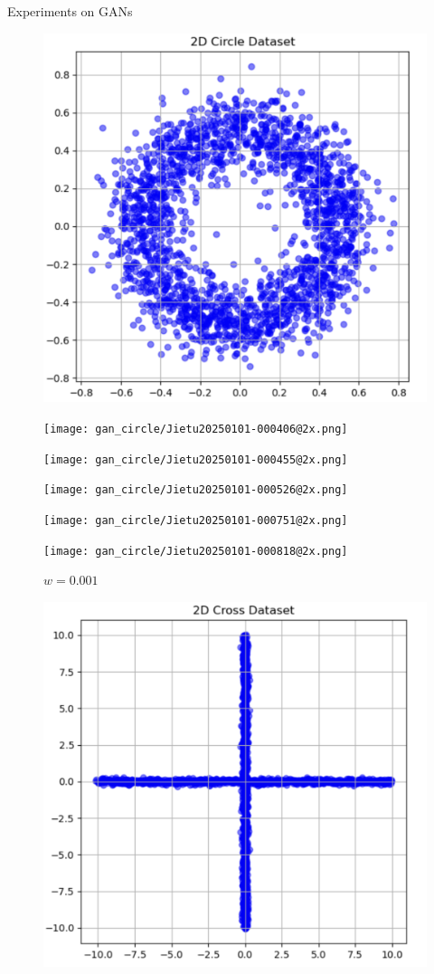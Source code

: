 \documentclass[final]{beamer}
\newlength{\colwidth}
\begin{document}
\begin{frame}[t]
\begin{columns}[t]
\begin{column}{\colwidth}
  \begin{block}{Experiments on GANs}
    \begin{figure}
        \centering
        \includegraphics[width=0.3\linewidth]{截屏2024-12-31 23.56.23.png}
    \end{figure}

    \begin{figure}
    \centering
    \begin{minipage}{0.19\textwidth}
    \centering
    \texttt{[image: gan\_circle/Jietu20250101-000406@2x.png]}
    \caption{$w=0$}
    \end{minipage}
    \begin{minipage}{0.19\textwidth}
    \centering
    \centering
    \texttt{[image: gan\_circle/Jietu20250101-000455@2x.png]}
    \caption{$w=1$}
    \end{minipage}
    \begin{minipage}{0.19\textwidth}
    \centering
    \texttt{[image: gan\_circle/Jietu20250101-000526@2x.png]}
    \caption{$w=0.1$}
    \end{minipage}
    \begin{minipage}{0.19\textwidth}
    \centering
    \texttt{[image: gan\_circle/Jietu20250101-000751@2x.png]}
    \caption{$w=0.01$}
    \end{minipage}
    \begin{minipage}{0.19\textwidth}
    \centering
    \texttt{[image: gan\_circle/Jietu20250101-000818@2x.png]}
    \caption{$w=0.001$}
    \end{minipage}
    \end{figure}


    \begin{figure}
        \centering
        \includegraphics[width=0.3\linewidth]{截屏2025-01-01 00.28.52.png}
    \end{figure}


\end{block}
\end{column}
\end{columns}
\end{frame}
\end{document}

